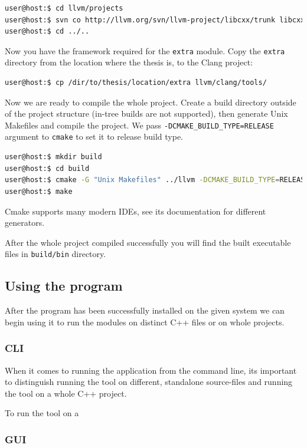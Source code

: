 \begin{lstlisting}[language=bash, frame=single]
user@host:$ cd llvm/projects
user@host:$ svn co http://llvm.org/svn/llvm-project/libcxx/trunk libcxx
user@host:$ cd ../..
\end{lstlisting}
\par Now you have the framework required for the \verb|extra| module. Copy the \verb|extra| directory from the location where the thesis is, to the Clang project:
\begin{lstlisting}[language=bash, frame=single]
user@host:$ cp /dir/to/thesis/location/extra llvm/clang/tools/
\end{lstlisting}
\par Now we are ready to compile the whole project. Create a build directory outside of the project structure (in-tree builds are not supported\cite{clang_getting_started}), then generate Unix Makefiles and compile the project. We pass \verb|-DCMAKE_BUILD_TYPE=RELEASE| argument to \verb|cmake| to set it to release build type.
\begin{lstlisting}[language=bash, frame=single]
user@host:$ mkdir build
user@host:$ cd build
user@host:$ cmake -G "Unix Makefiles" ../llvm -DCMAKE_BUILD_TYPE=RELEASE
user@host:$ make
\end{lstlisting}
\par Cmake supports many modern IDEs, see its documentation for different generators\cite{cmake_generator_doc}. \medskip
\par After the whole project compiled successfully you will find the built executable files in \verb|build/bin| directory.
\subsection{Using the program}
\par After the program has been successfully installed on the given system we can begin using it to run the modules on distinct C++ files or on whole projects. 
\subsubsection{CLI}
\par When it comes to running the application from the command line, its important to distinguish running the tool on different, standalone source-files and running the tool on a whole C++ project. \medskip
\par To run the tool on a 
\subsubsection{GUI}